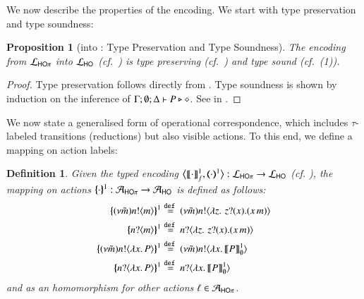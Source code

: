 \documentclass[preprint,11pt]{elsarticle}
\newtheorem{definition}{Definition}[section]
\newtheorem{proposition}{Proposition}[section]
\begin{document}
{{We now describe the properties of the encoding. 
We start with 
type preservation  and type soundness:

\begin{proposition}[\HOp into \HO: Type Preservation and Type Soundness]
\label{prop:typepres_HOp_to_HO}
The encoding from $\mathcal{L}_{\mathsf{HO}\pi}$ into $\mathcal{L}_{\mathsf{HO}}$ (cf.~)
is type preserving (cf.~) and type sound (cf.~(1)).
\end{proposition}}

\begin{proof}
Type preservation follows directly from .
Type soundness is shown by induction on the inference of $\Gamma; \emptyset; \Delta \vdash P \triangleright \diamond$.
See  in .
\end{proof}

We now state a generalised form of operational correspondence, which includes $\tau$-labeled transitions (reductions) but also visible actions.
To this end, we define a mapping  on action labels: 
\begin{definition}\label{d:actmap1}
Given the typed encoding 
$\enco{\map{\cdot}^{1}_f, \mapt{\cdot}^{1} %
}: \tyl{L}_{\HOp} \to \tyl{L}_{\HO}$ (cf. ),
the mapping on actions $\{\!\!\{\cdot\}\!\!\}^{1}: \mathcal{A}_{\mathsf{HO}\pi} \to \mathcal{A}_{\mathsf{HO}}$
	is defined as follows:
	\begin{align*}
		\mapa{(\nu \tilde{m})\bactout{n}{m}}^{1}
		& \defeq
		(\nu \tilde{m})\bactout{n}{\abs{z}{\,\binp{z}{x} (\appl{x}{m})} }
		\\
		\mapa{\bactinp{n}{m}}^{1}
		& \defeq
		\bactinp{n}{\abs{z}{\,\binp{z}{x} (\appl{x}{m})} }
		\\
		\mapa{(\nu \tilde{m})\bactout{n}{\abs{{x}}{P}}}^{1}
		& \defeq
		(\nu \tilde{m})\bactout{n}{\abs{{x}}{\pmapp{P}{1}{\es}}}
		\\ 
		\mapa{\bactinp{n}{\abs{{x}}{P}}}^{1}
		& \defeq
		\bactinp{n}{\abs{{x}}{\pmapp{P}{1}{\es}}}
	\end{align*}
	and as an homomorphism for other actions $\ell \in \mathcal{A}_{\mathsf{HO}\pi}$.
	\end{definition}
	
}
\end{document}
